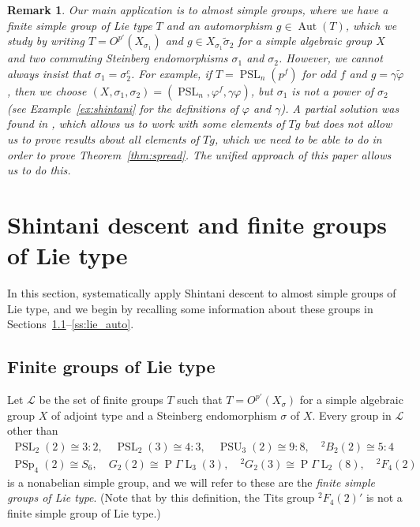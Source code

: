 \documentclass[11pt]{article}
\numberwithin{equation}{section}
\theoremstyle{shdefinition}
\newtheorem{remark}[definition]{Remark}
\theoremstyle{shplain}
\newcommand{\g}{\gamma}
\newcommand{\p}{\varphi}
\renewcommand{\wp}{\widetilde{\varphi}}
\newcommand{\s}{\sigma}
\newcommand{\ws}{\widetilde{\sigma}}
\renewcommand{\L}{\mathcal{L}}
\newcommand{\<}{\langle}
\renewcommand{\>}{\rangle}
\newcommand{\Aut}{\operatorname{Aut}}
\renewcommand{\:}{\colon}
\newcommand{\PSL}{\operatorname{PSL}}
\newcommand{\PGaL}{\operatorname{P}\!\Gamma\!\operatorname{L}}
\newcommand{\PSp}{\operatorname{PSp}}
\newcommand{\PSU}{\operatorname{PSU}}
\newcommand{\PGaU}{\operatorname{P}\!\Gamma\!\operatorname{L}}
\begin{document}
\begin{remark} \label{rem:shintani_power}
Our main application is to almost simple groups, where we have a finite simple group of Lie type $T$ and an automorphism $g \in \Aut(T)$, which we study by writing $T = O^{p'}(X_{\s_1})$ and $g \in X_{\s_1}\ws_2$ for a simple algebraic group $X$ and two commuting Steinberg endomorphisms $\s_1$ and $\s_2$. However, we cannot always insist that $\s_1 = \s_2^e$. For example, if $T = \PSL_n(p^f)$ for odd $f$ and $g = \g\wp$, then we choose $(X,\s_1,\s_2) = (\PSL_n, \p^f, \g\p)$, but $\s_1$ is not a power of $\s_2$ (see Example~\ref{ex:shintani} for the definitions of $\p$ and $\g$). A partial solution was found in \cite[Lemma~3.4.1]{ref:Harper17}, which allows us to work with some elements of $Tg$ but does not allow us to prove results about all elements of $Tg$, which we need to be able to do in order to prove Theorem~\ref{thm:spread}. The unified approach of this paper allows us to do this.
\end{remark}



\section{Shintani descent and finite groups of Lie type} \label{s:setup}

In this section, systematically apply Shintani descent to almost simple groups of Lie type, and we begin by recalling some information about these groups in Sections~\ref{ss:lie_intro}--\ref{ss:lie_auto}.

\subsection{Finite groups of Lie type} \label{ss:lie_intro}

Let $\L$ be the set of finite groups $T$ such that $T = O^{p'}(X_\s)$ for a simple algebraic group $X$ of adjoint type and a Steinberg endomorphism $\s$ of $X$. Every group in $\L$ other than
\begin{gather*}
\PSL_2(2) \cong 3{:}2, \quad \PSL_2(3) \cong 4{:}3,   \quad \PSU_3(2) \cong 9{:}8,       \quad {}^2B_2(2) \cong 5{:}4 \\
\PSp_4(2) \cong S_6,   \quad G_2(2) \cong \PGaU_3(3), \quad {}^2G_2(3) \cong \PGaL_2(8), \quad {}^2F_4(2)
\end{gather*}
is a nonabelian simple group, and we will refer to these are the \emph{finite simple groups of Lie type}. (Note that by this definition, the Tits group ${}^2F_4(2)'$ is not a finite simple group of Lie type.)
\end{document}
